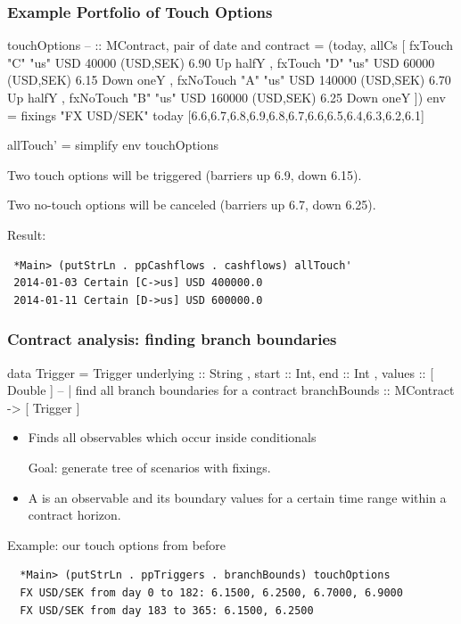 \documentclass[xcolor=dvipsnames,11pt]{beamer}
\renewcommand{\emph}[1]{\textcolor{structure!90}{#1}}
\begin{document}
\begin{frame}[fragile,t]
\frametitle{Example Portfolio of Touch Options}

\begin{hscodesmall}
touchOptions -- :: MContract, pair of date and contract
  = (today, allCs
     [ fxTouch   "C" "us" USD   40000 (USD,SEK) 6.90 Up   halfY
     , fxTouch   "D" "us" USD   60000 (USD,SEK) 6.15 Down oneY
     , fxNoTouch "A" "us" USD  140000 (USD,SEK) 6.70 Up   halfY
     , fxNoTouch "B" "us" USD  160000 (USD,SEK) 6.25 Down oneY ])
env = fixings "FX USD/SEK" today
      [6.6,6.7,6.8,6.9,6.8,6.7,6.6,6.5,6.4,6.3,6.2,6.1]

allTouch' = simplify env touchOptions
\end{hscodesmall}

{\scriptsize
Two touch options will be triggered (barriers up 6.9, down 6.15).

Two no-touch options will be canceled (barriers up 6.7, down 6.25).
}
\vfill
\emph{Result:} 
{\small
\begin{verbatim}
 *Main> (putStrLn . ppCashflows . cashflows) allTouch'
 2014-01-03 Certain [C->us] USD 400000.0
 2014-01-11 Certain [D->us] USD 600000.0
\end{verbatim}
}
\end{frame}

\begin{frame}[fragile]
\frametitle{Contract analysis: finding branch boundaries}

\begin{hscode}
data Trigger = Trigger { underlying :: String
                       , start :: Int, end :: Int
                       , values :: [ Double ] }
-- | find all branch boundaries for a contract
branchBounds :: MContract -> [ Trigger ]
\end{hscode}

\begin{itemize}
  \item Finds all observables which occur inside conditionals

      \emph{Goal:} generate tree of scenarios with fixings.
      
   \item A  is an \emph{observable} and \emph{its boundary values}
       for a certain \emph{time range} within a contract horizon.

\end{itemize}

\emph{Example:} our touch options from before
{\small
\begin{verbatim}
  *Main> (putStrLn . ppTriggers . branchBounds) touchOptions
  FX USD/SEK from day 0 to 182: 6.1500, 6.2500, 6.7000, 6.9000
  FX USD/SEK from day 183 to 365: 6.1500, 6.2500
\end{verbatim}
}

\end{frame}
\end{document}
